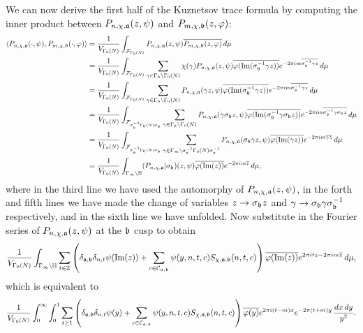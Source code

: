 \documentclass[12pt,oneside]{book}
\begin{document}
    We can now derive the first half of the Kuznetsov trace formula by computing the inner product between $P_{n,\chi,\mathfrak{a}}(z,\psi)$ and $P_{m,\chi,\mathfrak{b}}(z,\varphi)$: 
    \begin{align*}
      \langle P_{n,\chi,\mathfrak{a}}(\cdot,\psi),P_{m,\chi,\mathfrak{b}}(\cdot,\varphi)\rangle &= \frac{1}{V_{\Gamma_{0}(N)}}\int_{\mathcal{F}_{\Gamma_{0}(N)}}P_{n,\chi,\mathfrak{a}}(z,\psi)\overline{P_{m,\chi,\mathfrak{b}}(z,\varphi)}\,d\mu \\
      &= \frac{1}{V_{\Gamma_{0}(N)}}\int_{\mathcal{F}_{\Gamma_{0}(N)}}\sum_{\gamma \in \Gamma_{\mathfrak{b}}\backslash\Gamma_{0}(N)}\chi(\gamma)P_{n,\chi,\mathfrak{a}}(z,\psi)\overline{\varphi(\mathrm{Im}(\sigma_{\mathfrak{b}}^{-1}\gamma z))}e^{-2\pi im\overline{\sigma_{\mathfrak{b}}^{-1}\gamma z}}\,d\mu \\
      &= \frac{1}{V_{\Gamma_{0}(N)}}\int_{\mathcal{F}_{\Gamma_{0}(N)}}\sum_{\gamma \in \Gamma_{\mathfrak{b}}\backslash\Gamma_{0}(N)}P_{n,\chi,\mathfrak{a}}(\gamma z,\psi)\overline{\varphi(\mathrm{Im}(\sigma_{\mathfrak{b}}^{-1}\gamma z))}e^{-2\pi im\overline{\sigma_{\mathfrak{b}}^{-1}\gamma z}}\,d\mu \\
      &= \frac{1}{V_{\Gamma_{0}(N)}}\int_{\mathcal{F}_{\sigma_{\mathfrak{b}}^{-1}\Gamma_{0}(N)\sigma_{\mathfrak{b}}}}\sum_{\gamma \in \Gamma_{\mathfrak{b}}\backslash\Gamma_{0}(N)}P_{n,\chi,\mathfrak{a}}(\gamma\sigma_{\mathfrak{b}}z,\psi)\overline{\varphi(\mathrm{Im}(\sigma_{\mathfrak{b}}^{-1}\gamma\sigma_{\mathfrak{b}}z))}e^{-2\pi im\overline{\sigma_{\mathfrak{b}}^{-1}\gamma\sigma_{\mathfrak{b}}z}}\,d\mu \\
      &= \frac{1}{V_{\Gamma_{0}(N)}}\int_{\mathcal{F}_{\sigma_{\mathfrak{b}}^{-1}\Gamma_{0}(N)\sigma_{\mathfrak{b}}}}\sum_{\gamma \in \Gamma_{\infty}\backslash\sigma_{\mathfrak{b}}^{-1}\Gamma_{0}(N)\sigma_{\mathfrak{b}}^{-1}}P_{n,\chi,\mathfrak{a}}(\sigma_{\mathfrak{b}}\gamma z,\psi)\overline{\varphi(\mathrm{Im}(\gamma z))}e^{-2\pi im\overline{\gamma z}}\,d\mu \\
      &= \frac{1}{V_{\Gamma_{0}(N)}}\int_{\Gamma_{\infty}\backslash\mathbb{H}}(P_{n,\chi,\mathfrak{a}}|\sigma_{\mathfrak{b}})(z,\psi)\overline{\varphi(\mathrm{Im}(z))}e^{-2\pi im\overline{z}}\,d\mu,
    \end{align*}
    where in the third line we have used the automorphy of $P_{n,\chi,\mathfrak{a}}(z,\psi)$, in the forth and fifth lines we have made the change of variables $z \to \sigma_{\mathfrak{b}}z$ and $\gamma \to \sigma_{\mathfrak{b}}\gamma\sigma_{\mathfrak{b}}^{-1}$ respectively, and in the sixth line we have unfolded. Now substitute in the Fourier series of $P_{n,\chi,\mathfrak{a}}(z,\psi)$ at the $\mathfrak{b}$ cusp to obtain
    \[
      \frac{1}{V_{\Gamma_{0}(N)}}\int_{\Gamma_{\infty}\backslash\mathbb{H}}\sum_{t \in \mathbb{Z}}\left(\delta_{\mathfrak{a},\mathfrak{b}}\delta_{n,t}\psi(\mathrm{Im}(z))+\sum_{\substack{c \in \mathcal{C}_{\mathfrak{a},\mathfrak{b}}}}\psi(y,n,t,c)S_{\chi,\mathfrak{a},\mathfrak{b}}(n,t,c)\right)\overline{\varphi(\mathrm{Im}(z))}e^{2\pi itz-2\pi im\overline{z}}\,d\mu,
    \]
    which is equivalent to
    \[
      \frac{1}{V_{\Gamma_{0}(N)}}\int_{0}^{\infty}\int_{0}^{1}\sum_{t \ge 1}\left(\delta_{\mathfrak{a},\mathfrak{b}}\delta_{n,t}\psi(y)+\sum_{\substack{c \in \mathcal{C}_{\mathfrak{a},\mathfrak{b}}}}\psi(y,n,t,c)S_{\chi,\mathfrak{a},\mathfrak{b}}(n,t,c)\right)\overline{\varphi(y)}e^{2\pi i(t-m)x}e^{-2\pi(t+m)y}\,\frac{dx\,dy}{y^{2}}.
    \]
\end{document}
